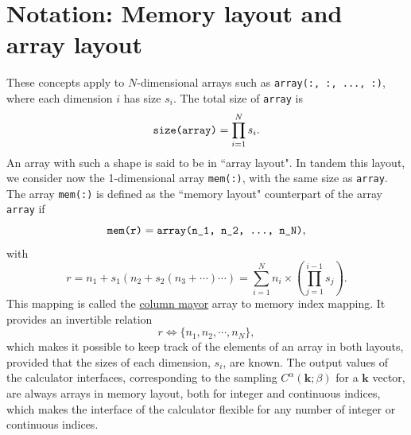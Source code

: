 \documentclass[10pt,a4paper]{article}
\begin{document}
\section{Notation: Memory layout and array layout}\label{sec:notation}
These concepts apply to $N$-dimensional arrays such as \verb|array(:, :, ..., :)|, where each dimension $i$ has size $s_i$. The total size of \verb|array| is
\begin{equation}
\verb|size(array)| = \prod_{i=1}^N s_i.
\end{equation}
An array with such a shape is said to be in ``array layout". In tandem this layout, we consider now the 1-dimensional array \verb|mem(:)|, with the same size as \verb|array|. The array \verb|mem(:)| is defined as the ``memory layout" counterpart of the array \verb|array| if
\begin{equation}
\verb|mem(r)| = \verb|array(n_1, n_2, ..., n_N)|,
\end{equation}
with
\begin{equation}\label{eq:column_mayor_mapping}
r = n_1 + s_1\left(n_2 + s_2\left(n_3 + \cdots\right)\cdots\right) = \sum_{i=1}^N n_i\times \left(\prod_{j=1}^{i-1}s_j\right).
\end{equation}
This mapping is called the \href{https://eli.thegreenplace.net/2015/memory-layout-of-multi-dimensional-arrays}{column mayor} array to memory index mapping. It provides an invertible relation
\begin{equation}
r \Leftrightarrow \{n_1, n_2, \cdots, n_N\},
\end{equation}
which makes it possible to keep track of the elements of an array in both layouts, provided that the sizes of each dimension, $s_i$, are known. The output values of the calculator interfaces, corresponding to the sampling $C^{\alpha}(\bm{k};\beta)$ for a $\bm{k}$ vector, are always arrays in memory layout, both for integer and continuous indices, which makes the interface of the calculator flexible for any number of integer or continuous indices.
\end{document}
